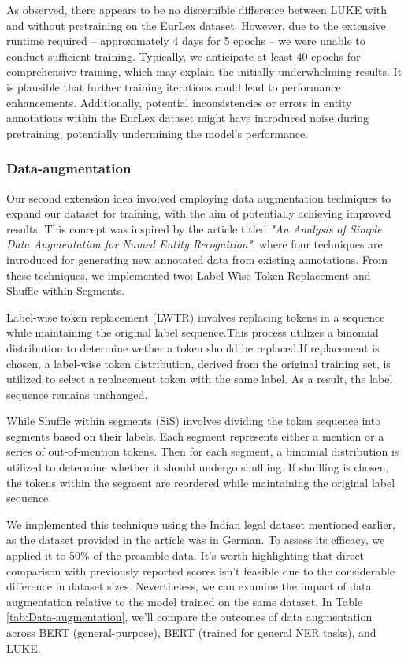 \documentclass{article}
\begin{document}
As observed, there appears to be no discernible difference between LUKE with and without pretraining on the EurLex dataset. However, due to the extensive runtime required – approximately 4 days for 5 epochs – we were unable to conduct sufficient training. Typically, we anticipate at least 40 epochs for comprehensive training, which may explain the initially underwhelming results. It is plausible that further training iterations could lead to performance enhancements. Additionally, potential inconsistencies or errors in entity annotations within the EurLex dataset might have introduced noise during pretraining, potentially undermining the model's performance.


\subsubsection{Data-augmentation}

Our second extension idea involved employing data augmentation techniques to expand our dataset for training, with the aim of potentially achieving improved results. This concept was inspired by the article titled \textit{"An Analysis of Simple Data Augmentation for Named Entity Recognition"}\cite{Data-augmentation}, where four techniques are introduced for generating new annotated data from existing annotations. From these techniques, we implemented two: Label Wise Token Replacement and Shuffle within Segments.

Label-wise token replacement (LWTR) involves replacing tokens in a sequence while maintaining the original label sequence.This process utilizes a binomial distribution to determine wether a token should be replaced.If replacement is chosen, a label-wise token distribution, derived from the original training set, is utilized to select a replacement token with the same label. As a result, the label sequence remains unchanged.

While Shuffle within segments (SiS) involves dividing the token sequence into segments based on their labels. Each segment represents either a mention or a series of out-of-mention tokens. Then for each segment, a binomial distribution is utilized to determine whether it should undergo shuffling. If shuffling is chosen, the tokens within the segment are reordered while maintaining the original label sequence.

We implemented this technique using the Indian legal dataset mentioned earlier, as the dataset provided in the article was in German. To assess its efficacy, we applied it to 50\% of the preamble data. It's worth highlighting that direct comparison with previously reported scores isn't feasible due to the considerable difference in dataset sizes. Nevertheless, we can examine the impact of data augmentation relative to the model trained on the same dataset. In Table \ref{tab:Data-augmentation}, we'll compare the outcomes of data augmentation across BERT (general-purpose), BERT (trained for general NER tasks), and LUKE.
\end{document}

